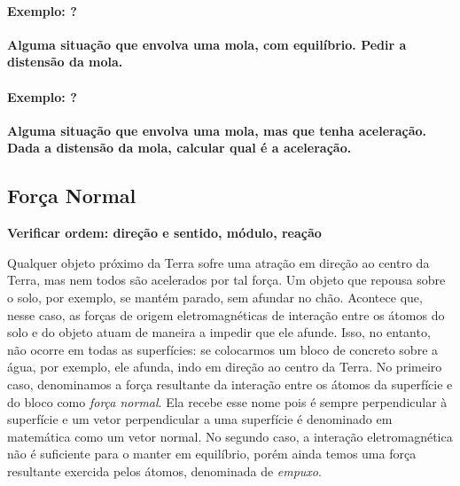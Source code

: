 \paragraph{Exemplo: ?}

\textbf{Alguma situação que envolva uma mola, com equilíbrio. Pedir a distensão da mola.}

\paragraph{Exemplo: ?}

\textbf{Alguma situação que envolva uma mola, mas que tenha aceleração. Dada a distensão da mola, calcular qual é a aceleração.}

\subsection{Força Normal} 

\textbf{Verificar ordem: direção e sentido, módulo, reação}

Qualquer objeto próximo da Terra sofre uma atração em direção ao centro da Terra, mas nem todos são acelerados por tal força. Um objeto que repousa sobre o solo, por exemplo, se mantém parado, sem afundar no chão. Acontece que, nesse caso, as forças de origem eletromagnéticas de interação entre os átomos do solo e do objeto atuam de maneira a impedir que ele afunde. Isso, no entanto, não ocorre em todas as superfícies: se colocarmos um bloco de concreto sobre a água, por exemplo, ele afunda, indo em direção ao centro da Terra. No primeiro caso, denominamos a força resultante da interação entre os átomos da superfície e do bloco como \emph{força normal}. Ela recebe esse nome pois é sempre perpendicular à superfície e um vetor perpendicular a uma superfície é denominado em matemática como um vetor normal. No segundo caso, a interação eletromagnética não é suficiente para o manter em equilíbrio, porém ainda temos uma força resultante exercida pelos átomos, denominada de \emph{empuxo}.

